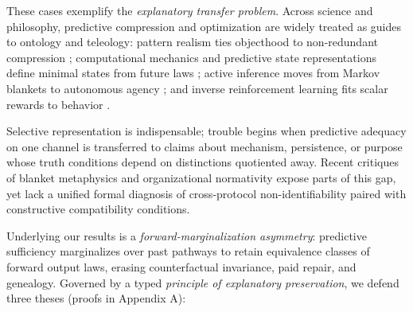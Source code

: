 \documentclass[11pt,letterpaper]{article}
\begin{document}
These cases exemplify the \emph{explanatory transfer problem}. Across
science and philosophy, predictive compression and optimization are
widely treated as guides to ontology and teleology: pattern realism ties
objecthood to non-redundant compression
\citep{dennett1987, dennett1991, ladymanRoss2007, wimsatt2007};
computational mechanics and predictive state representations define
minimal states from future laws
\citep{crutchfieldYoung1989, shaliziCrutchfield2001, littmanSuttonSingh2001, barnettCrutchfield2015};
active inference moves from Markov blankets to autonomous agency
\citep{friston2010, friston2013, clark2013, parrPezzuloFriston2022}; and
inverse reinforcement learning fits scalar rewards to behavior
\citep{puterman1994, ngRussell2000}.

Selective representation is indispensable; trouble begins when
predictive adequacy on one channel is transferred to claims about
mechanism, persistence, or purpose whose truth conditions depend on
distinctions quotiented away. Recent critiques of blanket metaphysics
\citep{raja2021, bruineberg2022} and organizational normativity
\citep{corti2023, bich2024, cuciniello2026} expose parts of this gap,
yet lack a unified formal diagnosis of cross-protocol
non-identifiability paired with constructive compatibility conditions.

Underlying our results is a \emph{forward-marginalization asymmetry}:
predictive sufficiency marginalizes over past pathways to retain
equivalence classes of forward output laws, erasing counterfactual
invariance, paid repair, and genealogy. Governed by a typed
\emph{principle of explanatory preservation}, we defend three theses
(proofs in Appendix A):
\end{document}
